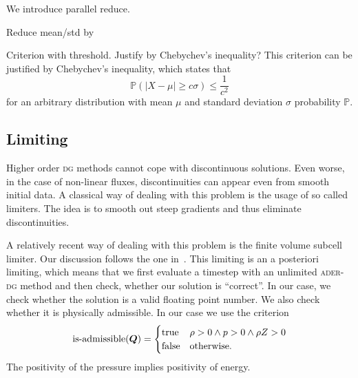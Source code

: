 We introduce parallel reduce.

Reduce mean/std by~\cite{chan1982updating}

Criterion with threshold.
Justify by Chebychev's inequality?
This criterion can be justified by Chebychev's inequality, which states that
\begin{equation}
  \label{eq:chebychev}
  \mathbb{P}(\vert X - \mu \vert \geq c \sigma) \leq \frac{1}{c^2}
\end{equation}
for an arbitrary distribution with mean $\mu$ and standard deviation $\sigma$ probability $\mathbb{P}$.


\subsection{Limiting}\label{sec:limiting}
Higher order \textsc{dg} methods cannot cope with discontinuous solutions.
Even worse, in the case of non-linear fluxes, discontinuities can appear even from smooth initial data.
A classical way of dealing with this problem is the usage of so called limiters.
The idea is to smooth out steep gradients and thus eliminate discontinuities.

A relatively recent way of dealing with this problem is the finite volume subcell limiter.
Our discussion follows the one in~\cite{dumbser2016simple}.
This limiting is an a posteriori limiting, which means that we first evaluate a timestep with an unlimited \textsc{ader-dg} method and then check, whether our solution is \enquote{correct}.
In our case, we check whether the solution is a valid floating point number.
We also check whether it is physically admissible.
In our case we use the criterion
\begin{equation}
  \label{eq:limiting-physical}
  \operatorname{is-admissible}(\bm{Q}) =
  \begin{cases}
    \text{true} & \rho > 0 \land p > 0 \land \rho Z > 0\\
    \text{false} & \text{otherwise}.
  \end{cases}
\end{equation}
The positivity of the pressure implies positivity of energy.

